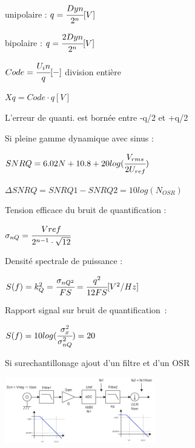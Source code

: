 
unipolaire : $q = \cfrac{Dyn}{2^n} [V]$

bipolaire : $q = \cfrac{2Dyn}{2^n} [V]$

$Code = \cfrac{U_in}{q} [-]$ division entière

$Xq = Code \cdot q [V]$

L’erreur de quanti. est bornée entre -q/2 et +q/2

\hformbar



Si pleine gamme dynamique avec sinus : 

$SNRQ = 6.02N + 10.8 + 20log(\cfrac{V_{rms}}{2U_{ref}}) $

$\Delta SNRQ = SNRQ1 - SNRQ2 =10log(N_{OSR}) $


Tension efficace du bruit de quantification : 

$\sigma_{nQ} = \cfrac{Vref}{2^{n-1}\cdot\sqrt{12}}$

Densité spectrale de puissance :

$S(f) = k_Q^2 = \cfrac{\sigma_{nQ^2}}{FS} = \cfrac{q^2}{12FS} [V^2 / Hz] $

Rapport signal sur bruit de quantification :

$S(f) = 10log(\cfrac{\sigma_{x}^2}{\sigma_{nQ}^2})  = 20$


Si surechantillonage  ajout d'un filtre et d'un OSR
\vspace{5mm}

\includegraphics[width = 0.49\textwidth,center]{img/Chaine-aquis.drawio.png}
